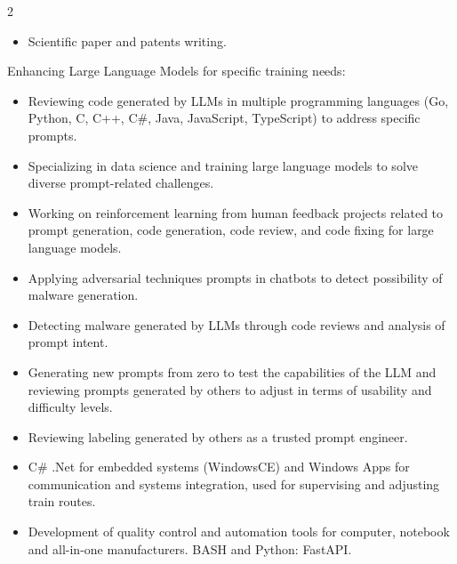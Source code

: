 \documentclass[10pt,a4paper,ragged2e,withhyper]{altacv}
\begin{document}
\begin{paracol}{2}
\begin{itemize}
    \item Scientific paper and patents writing.
    
\end{itemize}
\divider


Enhancing Large Language Models for specific training needs:

\begin{itemize}
        
    \item Reviewing code generated by LLMs in multiple programming languages (Go, Python, C, C++, C\#, Java, JavaScript, TypeScript) to address specific prompts.

    \item Specializing in data science and training large language models to solve diverse prompt-related challenges.

    \item Working on reinforcement learning from human feedback projects related to prompt generation, code generation, code review, and code fixing for large language models.

    \item Applying adversarial techniques prompts in chatbots to detect possibility of malware generation.

    \item Detecting malware generated by LLMs through code reviews and analysis of prompt intent.

    \item Generating new prompts from zero to test the capabilities of the LLM and reviewing prompts generated by others to adjust in terms of usability and difficulty levels.

    \item Reviewing labeling generated by others as a trusted prompt engineer.
    
\end{itemize}
\divider

\begin{itemize}

    \item C\# .Net for embedded systems (WindowsCE) and Windows Apps for communication and systems integration, used for supervising and adjusting train routes.

    \item Development of quality control and automation tools for computer, notebook and all-in-one manufacturers. BASH and Python: FastAPI.
    

\end{itemize}
\end{paracol}
\end{document}
